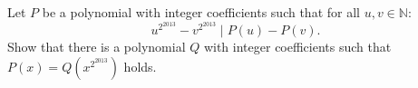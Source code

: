 Let $P$ be a polynomial with integer coefficients such that for all $u,v \in \mathbb{N}$:
$$u^{2^{2013}}-v^{2^{2013}} \mid P(u)-P(v).$$
Show that there is a polynomial $Q$ with integer coefficients such that
$P(x)=Q(x^{2^{2013}})$ holds.